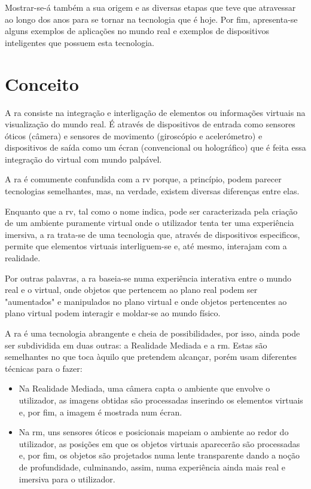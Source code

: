\documentclass{report}
\begin{document}
Mostrar-se-á também a sua origem e as diversas etapas que teve que atravessar ao longo dos anos para se tornar na tecnologia que é hoje. Por fim, apresenta-se alguns exemplos de aplicações no mundo real e exemplos de dispositivos inteligentes que possuem esta tecnologia.

\section{Conceito}
A \ac{ra} consiste na integração e interligação de elementos ou informações virtuais na visualização do mundo real. É através de dispositivos de entrada como sensores óticos (câmera) e sensores de movimento (giroscópio e acelerómetro) e dispositivos de saída como um écran (convencional ou holográfico) que é feita essa integração do virtual com mundo palpável.

A \ac{ra} é comumente confundida com a \ac{rv} porque, a princípio, podem parecer tecnologias semelhantes, mas, na verdade, existem diversas diferenças entre elas.

Enquanto que a \ac{rv}, tal como o nome indica, pode ser caracterizada pela criação de um ambiente puramente virtual onde o utilizador tenta ter uma experiência imersiva, a \ac{ra} trata-se de uma tecnologia que, através de dispositivos especificos, permite que elementos virtuais interliguem-se e, até mesmo, interajam com a realidade.

Por outras palavras, a \ac{ra} baseia-se numa experiência interativa entre o mundo real e o virtual, onde objetos que pertencem ao plano real podem ser "aumentados" e manipulados no plano virtual e onde objetos pertencentes ao plano virtual podem interagir e moldar-se ao mundo físico.

A \ac{ra} é uma tecnologia abrangente e cheia de possibilidades, por isso, ainda pode ser subdividida em duas outras: a Realidade Mediada e a \ac{rm}. Estas são semelhantes no que toca àquilo que pretendem alcançar, porém usam diferentes técnicas para o fazer:
\begin{itemize}
    \item Na Realidade Mediada, uma câmera capta o ambiente que envolve o utilizador, as imagens obtidas são processadas inserindo os elementos virtuais e, por fim, a imagem é mostrada num écran.
    \item Na \ac{rm}, uns sensores óticos e posicionais mapeiam o ambiente ao redor do utilizador, as posições em que os objetos virtuais aparecerão são processadas e, por fim, os objetos são projetados numa lente transparente dando a noção de profundidade, culminando, assim, numa experiência ainda mais real e imersiva para o utilizador.
\end{itemize}
\end{document}
